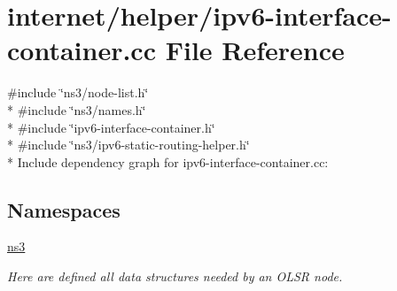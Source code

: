 \hypertarget{ipv6-interface-container_8cc}{}\section{internet/helper/ipv6-\/interface-\/container.cc File Reference}
\label{ipv6-interface-container_8cc}
{\ttfamily \#include \char`\"{}ns3/node-\/list.\+h\char`\"{}}\\*
{\ttfamily \#include \char`\"{}ns3/names.\+h\char`\"{}}\\*
{\ttfamily \#include \char`\"{}ipv6-\/interface-\/container.\+h\char`\"{}}\\*
{\ttfamily \#include \char`\"{}ns3/ipv6-\/static-\/routing-\/helper.\+h\char`\"{}}\\*
Include dependency graph for ipv6-\/interface-\/container.cc\+:
\subsection*{Namespaces}
\begin{DoxyCompactItemize}
\item 
 \hyperlink{namespacens3}{ns3}
\begin{DoxyCompactList}\small\item\em Here are defined all data structures needed by an O\+L\+SR node. \end{DoxyCompactList}\end{DoxyCompactItemize}
